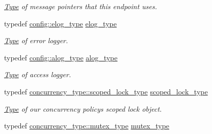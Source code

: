 \begin{DoxyCompactItemize}
\begin{DoxyCompactList}\small\item\em \mbox{\hyperlink{struct_type}{Type}} of message pointers that this endpoint uses. \end{DoxyCompactList}\item 
\mbox{\label{classwebsocketpp_1_1endpoint_a4ab98f4fed5b5b2740105eff732c7b1e}} 
typedef \mbox{\hyperlink{classwebsocketpp_1_1log_1_1stub}{config\+::elog\+\_\+type}} \mbox{\hyperlink{classwebsocketpp_1_1endpoint_a4ab98f4fed5b5b2740105eff732c7b1e}{elog\+\_\+type}}
\begin{DoxyCompactList}\small\item\em \mbox{\hyperlink{struct_type}{Type}} of error logger. \end{DoxyCompactList}\item 
\mbox{\label{classwebsocketpp_1_1endpoint_a1ca2ad5bfdd241a031746c3f158f4003}} 
typedef \mbox{\hyperlink{classwebsocketpp_1_1log_1_1stub}{config\+::alog\+\_\+type}} \mbox{\hyperlink{classwebsocketpp_1_1endpoint_a1ca2ad5bfdd241a031746c3f158f4003}{alog\+\_\+type}}
\begin{DoxyCompactList}\small\item\em \mbox{\hyperlink{struct_type}{Type}} of access logger. \end{DoxyCompactList}\item 
\mbox{\label{classwebsocketpp_1_1endpoint_ae16d71c671d97d4b29c5fd5806d45815}} 
typedef \mbox{\hyperlink{classwebsocketpp_1_1concurrency_1_1none_af2d121eeb6202694819578ba4bb00d3e}{concurrency\+\_\+type\+::scoped\+\_\+lock\+\_\+type}} \mbox{\hyperlink{classwebsocketpp_1_1endpoint_ae16d71c671d97d4b29c5fd5806d45815}{scoped\+\_\+lock\+\_\+type}}
\begin{DoxyCompactList}\small\item\em \mbox{\hyperlink{struct_type}{Type}} of our concurrency policy\textquotesingle{}s scoped lock object. \end{DoxyCompactList}\item 
\mbox{\label{classwebsocketpp_1_1endpoint_ab4aa523f6e1fddb2e77cdf7b36771992}} 
typedef \mbox{\hyperlink{classwebsocketpp_1_1concurrency_1_1none_a3cf002cfc62e64e920a91a06f5e6fbc3}{concurrency\+\_\+type\+::mutex\+\_\+type}} \mbox{\hyperlink{classwebsocketpp_1_1endpoint_ab4aa523f6e1fddb2e77cdf7b36771992}{mutex\+\_\+type}}

\end{DoxyCompactItemize}
